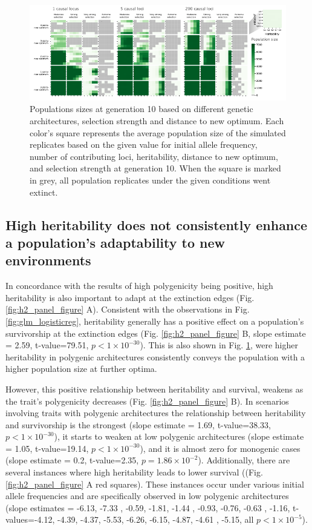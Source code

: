 \documentclass{article}
\begin{document}
\begin{figure}[H]
  \centering
  \includegraphics[width=1\textwidth]{figures/pop_size_GEN10.pdf}
  \caption{Populations sizes at generation 10 based on different genetic architectures, selection strength and distance to new optimum. Each color's square represents the average population size of the simulated replicates based on the given value for initial allele frequency, number of contributing loci, heritability, distance to new optimum, and selection strength at generation 10. When the square is marked in grey, all population replicates under the given conditions went extinct.}
  \label{fig:pop_size_poly_gen10}
\end{figure}

\subsection{High heritability does not consistently enhance a population’s adaptability to new environments}
In concordance with the results of high polygenicity being positive, high heritability is also important to adapt at the extinction edges (Fig. \ref{fig:h2_panel_figure} A). Consistent with the observations in Fig. \ref{fig:glm_logisticreg}, heritability generally has a positive effect on a population's survivorship at the extinction edges (Fig. \ref{fig:h2_panel_figure} B, slope estimate = 2.59, t-value=79.51, $p<1 \times 10^{-30}$). This is also shown in Fig. \ref{fig:pop_size_poly_gen10}, were higher heritability in polygenic architectures consistently conveys the population with a higher population size at further optima.

However, this positive relationship between heritability and survival, weakens as the trait's polygenicity decreases (Fig. \ref{fig:h2_panel_figure} B). In scenarios involving traits with polygenic architectures the relationship between heritability and survivorship is the strongest (slope estimate = 1.69, t-value=38.33, $p<1 \times 10^{-30}$), it starts to weaken at low polygenic architectures (slope estimate = 1.05, t-value=19.14, $p<1 \times 10^{-30}$), and it is almost zero for monogenic cases (slope estimate = 0.2, t-value=2.35, $p=1.86 \times 10^{-2}$). Additionally, there are several instances where high heritability leads to lower survival ((Fig. \ref{fig:h2_panel_figure} A red squares). These instances occur under various initial allele frequencies and are specifically observed in low polygenic architectures (slope estimates = -6.13, -7.33 , -0.59, -1.81, -1.44 , -0.93, -0.76, -0.63 , -1.16, t-values=-4.12, -4.39, -4.37, -5.53, -6.26, -6.15, -4.87, -4.61 , -5.15, all $p<1 \times 10^{-5}$).
\end{document}
